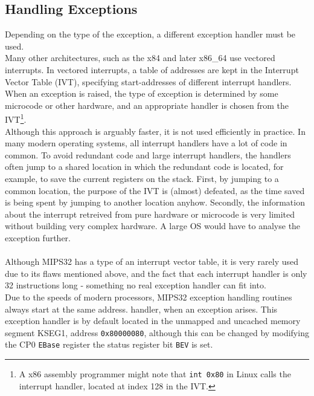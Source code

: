 \subsection{Handling Exceptions}
Depending on the type of the exception, a different exception handler must be
used.\\
Many other architectures, such as the x84 and later x86\_64 use vectored
interrupts. In vectored interrupts, a table of addresses are kept in the
Interrupt Vector Table (IVT), specifying start-addresses of different
interrupt handlers. When an exception is raised, the type of exception is
determined by some microcode or other hardware, and an appropriate handler is
chosen from the IVT\footnote{A x86 assembly
programmer might note that \texttt{int 0x80} in Linux calls the interrupt handler,
located at index 128 in the IVT.}\cite{osdev:interrupt_vector_table}\cite{see_mips_run}. \\
Although this approach is arguably faster, it is not used efficiently in
practice. In many modern operating systems, all interrupt handlers have a lot
of code in common. To avoid redundant code and large interrupt handlers, the
handlers often jump to a shared location in which the redundant code is located,
for example, to save the current registers on the stack.
First, by jumping to a common location, the purpose of the IVT is (almost) defeated,
as the time saved is being spent by jumping to another location anyhow. Secondly, the
information about the interrupt retreived from pure hardware or microcode is
very limited without building very complex hardware. A large OS would have to
analyse the exception further.\\\\
Although MIPS32 has a type of an interrupt vector table\cite{see_mips_run}, it is very rarely used due to its
flaws mentioned above, and the fact that each interrupt handler is only 32
instructions long - something no real exception handler can fit into\cite{see_mips_run}.\\
Due to the speeds of modern processors, MIPS32 exception handling routines always
start at the same address.
handler, when an exception arises. This exception handler is by default located in the
unmapped and uncached memory segment KSEG1, address \texttt{0x80000080}, although
this can be changed by modifying the CP0 \texttt{EBase} register the status register bit
\texttt{BEV} is set\cite{see_mips_run}.

